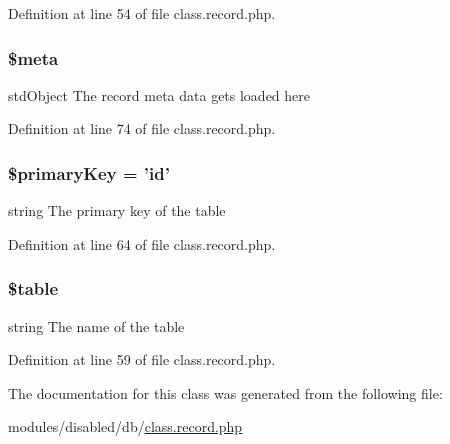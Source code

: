 Definition at line 54 of file class.\-record.\-php.

\hypertarget{class_record_a9e6fc1ae0498be7d1e682f8bcc9299df}{
\subsubsection[{\$meta}]{\setlength{\rightskip}{0pt plus 5cm}\$meta}}\label{class_record_a9e6fc1ae0498be7d1e682f8bcc9299df}
std\-Object The record meta data gets loaded here 

Definition at line 74 of file class.\-record.\-php.

\hypertarget{class_record_a927b0256b942a3ee89485f2649af7981}{
\subsubsection[{\$primary\-Key}]{\setlength{\rightskip}{0pt plus 5cm}\$primary\-Key = 'id'\hspace{0.3cm}{\ttfamily [protected]}}}\label{class_record_a927b0256b942a3ee89485f2649af7981}
string The primary key of the table 

Definition at line 64 of file class.\-record.\-php.

\hypertarget{class_record_ae8876a14058f368335baccf35af4a22b}{
\subsubsection[{\$table}]{\setlength{\rightskip}{0pt plus 5cm}\$table\hspace{0.3cm}{\ttfamily [protected]}}}\label{class_record_ae8876a14058f368335baccf35af4a22b}
string The name of the table 

Definition at line 59 of file class.\-record.\-php.



The documentation for this class was generated from the following file\-:\begin{DoxyCompactItemize}
\item 
modules/disabled/db/\hyperlink{class_8record_8php}{class.\-record.\-php}\end{DoxyCompactItemize}
